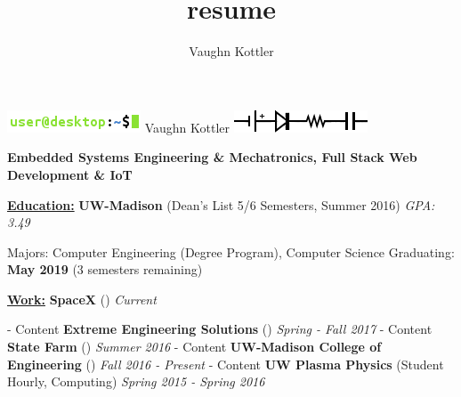\documentclass[letterpaper,10pt]{article}
\title{resume}
\author{Vaughn Kottler}
\begin{document}
\begin{center}\Huge
	\includegraphics[natwidth=150,natheight=25]{im/terminal.png}
	Vaughn Kottler
	\includegraphics[natwidth=150,natheight=25]{im/circuit.png}
\end{center}

\begin{center}\large
    \color{maroon}\textbf{
        Embedded Systems Engineering \& Mechatronics, Full Stack Web Development \& IoT
    }
\end{center}%

\noindent
\textbf{\underline{Education:}}\hspace{2.6em}%
%
\textbf{UW-Madison}
(Dean's List 5/6 Semesters, Summer 2016)
\textit{GPA: 3.49}
%
\begin{adjustwidth}{1.2in}{0in}
	Majors: Computer Engineering (Degree Program), Computer Science\break
	Graduating: \textbf{May 2019} (3 semesters remaining)\break
\end{adjustwidth}

\noindent
\textbf{\underline{Work:}}\hspace{5.6em}%
%
\textbf{SpaceX}
({\color{blue}\underline{}})
\textit{Current}
%
\begin{adjustwidth}{1.2in}{0in}
	- Content
	\break
	\textbf{Extreme Engineering Solutions}
	({\color{blue}\underline{}})
	\textit{Spring - Fall 2017}
	\break
	- Content
	\break
	\textbf{State Farm}
	({\color{blue}\underline{}})
	\textit{Summer 2016}
	\break
	- Content
	\break
	\textbf{UW-Madison College of Engineering}
	({\color{blue}\underline{}})
	\textit{Fall 2016 - Present}
	\break
	- Content
	\break
	\textbf{UW Plasma Physics}
	(Student Hourly, Computing)
	\textit{Spring 2015 - Spring 2016}
\end{adjustwidth}
\end{document}
